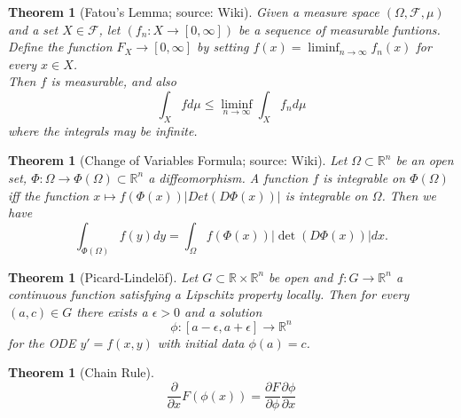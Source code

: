 \documentclass[12pt,a4paper]{article}
\newtheorem{thm}[definition]{Theorem}
\newcommand{\Rn}{\mathbb{R}^n}
\begin{document}
\begin{thm}[Fatou's Lemma; source: Wiki]
Given a measure space $(\Omega, \mathcal{F}, \mu)$ and a set $X\in \mathcal{F}$, let $(f_n:X\rightarrow [0,\infty])$ be  a sequence of measurable funtions. Define the function $F_X\rightarrow[0,\infty]$ by setting $f(x)=\liminf_{n\rightarrow\infty} f_n(x)$ for every $x\in X$.\\
Then $f$ is measurable, and also
\begin{equation}
\int_X f d\mu \leq \liminf_{n\rightarrow \infty}\int_X f_n d\mu
\end{equation} 
where the integrals may be infinite.
\end{thm}

\begin{thm}[Change of Variables Formula; source: Wiki]
Let $\Omega \subset \Rn$ be an open set, $\Phi: \Omega \rightarrow \Phi(\Omega)\subset\Rn$ a diffeomorphism. A function $f$ is integrable on $\Phi(\Omega)$ iff the function $x \mapsto f(\Phi(x))\lvert Det(D\Phi(x)) \rvert$ is integrable on $\Omega$. Then we have
\begin{equation}
\int_{\Phi(\Omega)} f(y) dy = \int_{\Omega} f(\Phi(x))\lvert \det(D\Phi(x)) \rvert dx.
\end{equation}
\end{thm}

\begin{thm}[Picard-Lindelöf]
Let $G\subset \mathbb{R}\times\Rn$ be open and $f:G\rightarrow \Rn$ a continuous function satisfying a Lipschitz property locally. Then for every $(a,c)\in G$ there exists a $\epsilon >0$ and a solution
\begin{equation}
\phi:[a-\epsilon,a+\epsilon]\rightarrow\Rn
\end{equation}
for the ODE $y'=f(x,y)$ with initial data $\phi(a)=c$.
\end{thm}

\begin{thm}[Chain Rule]
\begin{equation}
\frac{\partial}{\partial x} F(\phi(x)) = \frac{\partial F}{\partial \phi} \frac{\partial \phi}{\partial x}
\end{equation}
\end{thm}
\end{document}
